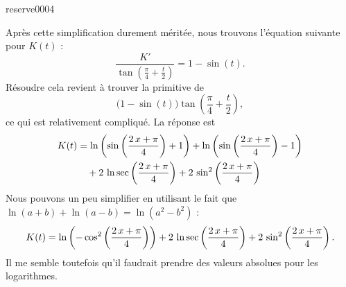 \begin{corrige}{reserve0004}
\begin{enumerate}
Après cette simplification durement méritée, nous trouvons l'équation suivante pour $K(t)$ :
\begin{equation}		\label{EqFracII107exoVVprb}
	\frac{ K' }{ \tan\left( \frac{ \pi }{ 4 }+\frac{ t }{ 2 } \right) }=1-\sin(t).
\end{equation}
Résoudre cela revient à trouver la primitive de
\begin{equation}
\big( 1-\sin(t) \big) \tan\left( \frac{ \pi }{ 4 }+\frac{ t }{ 2 } \right),
\end{equation}
ce qui est relativement compliqué. La réponse est
\begin{equation}
	\begin{aligned}[]
		K(t)	&=\ln \left(\sin \left({{2\,x+\pi}\over{4}}\right)+1\right)+\ln  \left(\sin \left({{2\,x+\pi}\over{4}}\right)-1\right)\\
			&\quad+2\,\ln \sec  \left({{2\,x+\pi}\over{4}}\right)+2\,\sin ^2\left({{2\,x+\pi}\over{4 }}\right)
	\end{aligned}
\end{equation}
Nous pouvons un peu simplifier en utilisant le fait que $\ln(a+b)+\ln(a-b)=\ln(a^2-b^2)$ :
\begin{equation}
	\begin{aligned}[]
		K(t)	=\ln\left(-\cos^2 \left({{2\,x+\pi}\over{4}}\right)\right)
			+2\,\ln \sec  \left({{2\,x+\pi}\over{4}}\right)+2\,\sin ^2\left({{2\,x+\pi}\over{4 }}\right).
	\end{aligned}
\end{equation}
Il me semble toutefois qu'il faudrait prendre des valeurs absolues pour les logarithmes.

\end{enumerate}

\end{corrige}
